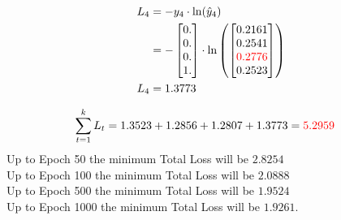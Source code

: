 \documentclass{article}
\begin{document}
\begin{align*}
    L_4 &= -y_4 \cdot \ln(\hat{y}_4) \\
    &= -\begin{bmatrix} 0. \\ 0. \\ 0. \\ 1. \end{bmatrix} \cdot \ln\left(\begin{bmatrix}
0.2161 \\
0.2541 \\
\textcolor{red}{0.2776} \\
0.2523
\end{bmatrix}\right) \\
    L_4 &= 1.3773
\end{align*}

\begin{align*}
    \sum_{t=1}^k L_t & = 1.3523 + 1.2856 + 1.2807 + 1.3773 = \textcolor{red}{5.2959}
\end{align*}
Up to Epoch 50 the minimum Total Loss will be $2.8254$\\
Up to Epoch 100 the minimum Total Loss will be $2.0888$\\
Up to Epoch 500 the minimum Total Loss will be $1.9524$\\
Up to Epoch 1000 the minimum Total Loss will be $1.9261$.
\end{document}
